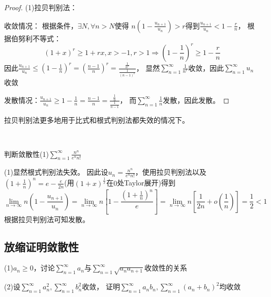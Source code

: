 \begin{proof}
  (1)拉贝判别法：

  收敛情况：
  根据条件，$\exists N, \forall n > N$使得
  $n \left( 1- \frac{u_{n+1}}{u_n} \right) > r$得到$\frac{u_{n+1}}{u_n} < 1 - \frac{r}{n}$，
  根据伯努利不等式：
  \begin{equation*}
    (1 + x)^r \geq 1 + rx, x > -1, r > 1 \Rightarrow \left( 1 - \frac{1}{n} \right)^r \geq 1 - \frac{r}{n}
  \end{equation*}
  因此$\frac{u_{n+1}}{u_n} \leq \left( 1 - \frac{1}{n} \right)^r = \left( \frac{n-1}{n} \right)^r = \frac{\frac{1}{n^r}}{\frac{1}{(n-1)^r}}$，
  显然$\sum\limits_{n = 1}^{\infty}\frac{1}{n^r}$收敛，因此$\sum\limits_{n = 1}^{\infty}u_n$收敛

  发散情况：$\frac{u_{n+1}}{u_n} \geq 1 - \frac{1}{n} = \frac{n-1}{n} = \frac{\frac{1}{n}}{\frac{1}{n-1}}$，
  而$\sum\limits_{n = 1}^{\infty} \frac{1}{n}$发散，因此发散。
\end{proof}


\begin{note}
  拉贝判别法更多地用于比式和根式判别法都失效的情况下。
\end{note}

~

\begin{exercise}[拉贝判别法]
  判断敛散性(1)$\sum\limits_{n = 1}^{\infty} \frac{n^n}{e^nn!}$
\end{exercise}

\begin{solution}
  (1)显然根式判别法失效。
  因此设$u_n = \frac{n^n}{e^nn!}$，使用拉贝判别法以及$(1 + \frac{1}{n})^n = e - \frac{e}{2n}$(用$(1+x)^{\frac{1}{x}}$在$0$处Taylor展开)得到
  \begin{equation*}
    \lim \limits _{n \rightarrow \infty} n \left( 1 - \frac{u_{n+1}}{u_n} \right) = \lim \limits _{n \rightarrow \infty}  n \left[ 1 - \frac{(1 + \frac{1}{n})^n}{e} \right] = \lim \limits _{n \rightarrow \infty} n \left[ \frac{1}{2n} + o(\frac{1}{n}) \right] = \frac{1}{2} < 1 
  \end{equation*}
  根据拉贝判别法可知发散。
\end{solution}

\subsection{放缩证明敛散性}

\begin{exercise}[两个简单放缩]
  (1)$a_n \geq 0$，讨论$\sum\limits_{n = 1}^{\infty}a_n$与$\sum\limits_{n = 1}^{\infty}\sqrt{a_n a_{n+1}}$收敛性的关系

  (2)设$\sum\limits_{n = 1}^{\infty}a_n^2, \sum\limits_{n = 1}^{\infty}b_n^2$收敛，
  证明$\sum\limits_{n = 1}^{\infty}a_nb_n, \sum\limits_{n = 1}^{\infty}(a_n + b_n)^2$均收敛
\end{exercise}

